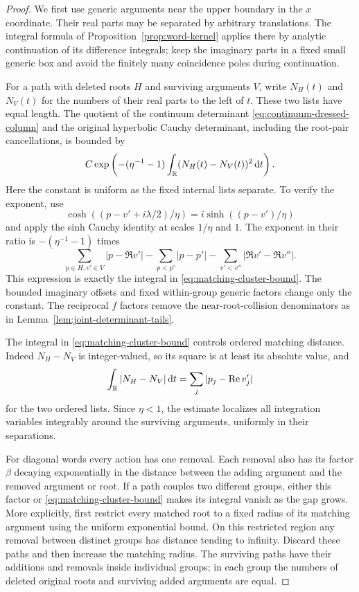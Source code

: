 \begin{proof}
We first use generic arguments near the upper boundary in the
$x$ coordinate.  Their real parts may be separated by arbitrary
translations.  The integral formula of
Proposition~\ref{prop:word-kernel} applies there by analytic
continuation of its difference integrals; keep the imaginary
parts in a fixed small generic box and avoid the finitely many
coincidence poles during continuation.

For a path with deleted roots $H$ and surviving arguments $V$,
write $N_H(t)$ and $N_V(t)$ for the numbers of their real parts
to the left of $t$.  These two lists have equal length.
The quotient of the continuum determinant
\eqref{eq:continuum-dressed-column} and the original hyperbolic
Cauchy determinant, including the root-pair cancellations, is
bounded by
\begin{equation}\label{eq:matching-cluster-bound}
 C\exp\left(-(\eta^{-1}-1)
                   \int_\mathbb R(N_H(t)-N_V(t))^2\,\mathrm d t\right).
\end{equation}
Here the constant is uniform as the fixed internal lists separate.
To verify the exponent, use
\[
 \cosh((p-v'+i\lambda/2)/\eta)
       =i\sinh((p-v')/\eta)
\]
and apply the sinh Cauchy identity at scales $1/\eta$ and $1$.
The exponent in their ratio is $-(\eta^{-1}-1)$ times
\[
 \sum_{p\in H,v'\in V}|p-\Re v'|
       -\sum_{p<p'}|p-p'|
       -\sum_{v'<v''}|\Re v'-\Re v''|.
\]
This expression is exactly the integral in
\eqref{eq:matching-cluster-bound}.  The bounded imaginary offsets
and fixed within-group generic factors change only the constant.
The reciprocal $f$ factors remove the near-root-collision
denominators as in Lemma~\ref{lem:joint-determinant-tails}.

The integral in \eqref{eq:matching-cluster-bound} controls ordered
matching distance.  Indeed $N_H-N_V$ is integer-valued, so its
square is at least its absolute value, and
\[
 \int_\mathbb R|N_H-N_V|\,\mathrm d t
     =\sum_j|p_j-\operatorname{Re} v'_j|
\]
for the two ordered lists.  Since $\eta<1$, the estimate
localizes all integration variables integrably around the
surviving arguments, uniformly in their separations.

For diagonal words every action has one removal.  Each removal
also has its factor $\beta$ decaying exponentially in the
distance between the adding argument and the removed argument
or root.  If a path couples two different groups, either this
factor or \eqref{eq:matching-cluster-bound} makes its integral
vanish as the gap grows.  More explicitly, first restrict every
matched root to a fixed radius of its matching argument using
the uniform exponential bound.  On this restricted region any
removal between distinct groups has distance tending to infinity.
Discard these paths and then increase the matching radius.
The surviving paths have their additions and removals inside
individual groups; in each group the numbers of deleted original
roots and surviving added arguments are equal.


\end{proof}
